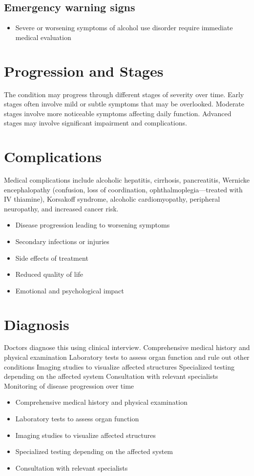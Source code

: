 \subsection{Emergency warning signs}
\begin{itemize}[noitemsep]
  \item Severe or worsening symptoms of alcohol use disorder require immediate medical evaluation
\end{itemize}
\section{Progression and Stages}
The condition may progress through different stages of severity over time. Early stages often involve mild or subtle symptoms that may be overlooked. Moderate stages involve more noticeable symptoms affecting daily function. Advanced stages may involve significant impairment and complications.
\section{Complications}
Medical complications include alcoholic hepatitis, cirrhosis, pancreatitis, Wernicke encephalopathy (confusion, loss of coordination, ophthalmoplegia---treated with IV thiamine), Korsakoff syndrome, alcoholic cardiomyopathy, peripheral neuropathy, and increased cancer risk.

\begin{itemize}[noitemsep]
  \item Disease progression leading to worsening symptoms
  \item Secondary infections or injuries
  \item Side effects of treatment
  \item Reduced quality of life
  \item Emotional and psychological impact
\end{itemize}
\section{Diagnosis}
Doctors diagnose this using clinical interview. Comprehensive medical history and physical examination Laboratory tests to assess organ function and rule out other conditions Imaging studies to visualize affected structures Specialized testing depending on the affected system Consultation with relevant specialists Monitoring of disease progression over time

\begin{itemize}[noitemsep]
  \item Comprehensive medical history and physical examination
  \item Laboratory tests to assess organ function
  \item Imaging studies to visualize affected structures
  \item Specialized testing depending on the affected system
  \item Consultation with relevant specialists
\end{itemize}
